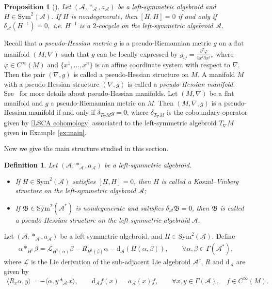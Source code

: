 \documentclass[pdftex]{sigma}%
\numberwithin{equation}{section}
\newtheorem{pro}[thm]{Proposition}
\newtheorem{defi}[thm]{Definition}
\newcommand{\huaA}{\mathcal{A}}
\newcommand{\huaL}{\mathcal{L}}
\newcommand{\frkB}{\mathfrak B}
\newcommand{\CWM}{C^{\infty}(M)}
\newcommand{\dM}{\mathrm{d}}
\newcommand{\Sym}{\mathrm{Sym}}
\begin{document}
\begin{pro}[\cite{lsb2}]%
Let $(\huaA,\ast_\huaA,a_\huaA)$ be a left-symmetric algebroid and $H\in \Sym^2(\huaA)$. If $H$ is nondegenerate, then
 $[ H,H]=0$ if and only if $\delta_\huaA (H^{-1})=0,$ i.e. $H^{-1}$ is a $2$-cocycle on the left-symmetric algebroid $\huaA.$

\end{pro}

Recall that a {\it pseudo-Hessian metric} $g$ is a
pseudo-Riemannian metric $g$ on a flat manifold $(M,\nabla)$ such
that $g$ can be locally expressed by
$g_{ij}=\frac{\partial^2\varphi}{\partial x^i\partial x^j},$ where
$\varphi\in\CWM$ and $\big\{x^1,\dots,x^n\big\}$ is an affine coordinate
system with respect to $\nabla$. Then the pair $(\nabla,g)$ is called a
pseudo-Hessian structure on $M$. A manifold $M$ with a
pseudo-Hessian structure $(\nabla,g)$ is called a {\it pseudo-Hessian manifold.}
 See~\cite{Geometry-of-Hessian-structures} for more
details about pseudo-Hessian manifolds.
 Let $(M,\nabla)$ be a flat manifold and $g$ a pseudo-Riemannian metric on $M$. Then $(M,\nabla,g)$ is a pseudo-Hessian manifold if and only if $\delta_{T_\nabla M} g=0$, where $\delta_{T_\nabla M}$ is the coboundary operator given by \eqref{LSCA cohomology} associated to the left-symmetric algebroid $T_\nabla M $ given in Example \ref{ex:main}.


Now we give the main structure studied in this section.


\begin{defi}
Let $(\huaA,\ast_\huaA,a_\huaA)$ be a left-symmetric algebroid.
 \begin{itemize}\itemsep=0pt
 \item[$(i)$] If $H\in \Sym^2(\huaA)$ satisfies $[ H,H]=0$, then $H$ is called a {\it Koszul--Vinberg structure} on the left-symmetric algebroid $\huaA$;
\item[$(ii)$] If $\frkB\in \Sym^2(\huaA^*)$ is nondegenerate and satisfies $\delta_\huaA\frkB=0$, then $\frkB$ is called a {\it pseudo-Hessian structure} on the left-symmetric algebroid $\huaA$.
 \end{itemize}\end{defi}

Let $(\huaA,\ast_\huaA,a_\huaA)$ be a left-symmetric algebroid, and $H\in \Sym^2(\huaA)$. Define
\begin{gather}\label{eq:multiplication-H}
\alpha\ast_{H^\sharp} \beta=\huaL_{H^\sharp(\alpha)}\beta-R_{H^\sharp(\beta)}\alpha-{\dM_\huaA} (H(\alpha,\beta)), \qquad\forall
\alpha,\beta\in\Gamma(\huaA^*),
\end{gather}
where $\huaL$ is the Lie derivation of the sub-adjacent Lie algebroid $\huaA^c$, $R$ and $\dM_\huaA$ are given by
\begin{gather*}
\langle R_x\alpha,y\rangle=-\langle\alpha,y\ast_\huaA x\rangle,\qquad
\dM_\huaA f(x)=a_\huaA(x)f,\qquad
\forall x,y\in\Gamma(\huaA),\quad f\in \CWM.
\end{gather*}
\end{document}
